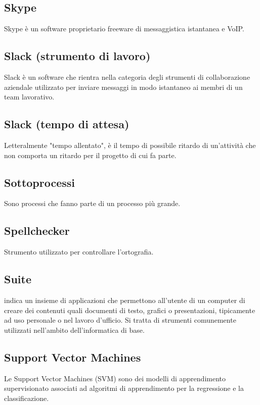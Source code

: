 
\subsection*{Skype}
Skype è un software proprietario freeware di messaggistica istantanea e VoIP.

\subsection*{Slack (strumento di lavoro)}
Slack è un software che rientra nella categoria degli strumenti di collaborazione aziendale utilizzato per inviare messaggi in modo istantaneo ai membri di un team lavorativo.

\subsection*{Slack (tempo di attesa)}
Letteralmente "tempo allentato", è il tempo di possibile ritardo di un’attività che non comporta
un ritardo per il progetto di cui fa parte.

\subsection*{Sottoprocessi}
Sono processi che fanno parte di un processo più grande.

\subsection*{Spellchecker}
Strumento utilizzato per controllare l'ortografia.

\subsection*{Suite}
indica un insieme di applicazioni che permettono all'utente di un computer di creare dei contenuti quali documenti di testo, grafici o presentazioni, tipicamente ad uso personale o nel lavoro d'ufficio. 
Si tratta di strumenti comunemente utilizzati nell'ambito dell'informatica di base.

\subsection*{Support Vector Machines}
Le Support Vector Machines (SVM) sono dei modelli di apprendimento supervisionato associati ad algoritmi di apprendimento per la regressione e la classificazione.

